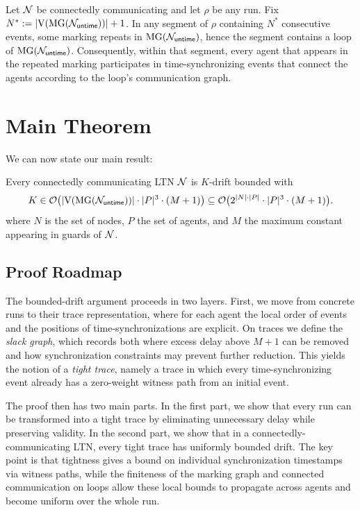 \begin{lemma}
\label{lem:segment-has-sync}
Let $\mathcal{N}$ be connectedly communicating and let $\rho$ be any run.
Fix $N^* := |\mathrm{V}(\operatorname{MG}(\mathcal{N}_{\mathsf{untime}}))|+1$.
In any segment of $\rho$ containing $N^*$ consecutive events, some marking repeats in $\operatorname{MG}(\mathcal{N}_{\mathsf{untime}})$, hence the segment contains a loop of $\operatorname{MG}(\mathcal{N}_{\mathsf{untime}})$.
Consequently, within that segment, every agent that appears in the repeated marking participates in time-synchronizing events that connect the agents according to the loop's communication graph.
\end{lemma}


\section{Main Theorem}

We can now state our main result:

\begin{theorem}
Every connectedly communicating LTN $\mathcal{N}$ is $K$-drift bounded with
\[
K \in \mathcal{O}\bigl(|\mathrm{V}(\operatorname{MG}(\mathcal{N}_{\mathsf{untime}}))|\cdot |P|^3 \cdot (M+1)\bigr)
\subseteq \mathcal{O}\bigl(2^{|N|\cdot|P|}\cdot |P|^3 \cdot (M+1)\bigr).
\]
   where $N$ is the set of nodes, $P$ the set of agents, and $M$ the maximum constant appearing in guards of $\mathcal{N}$. 
\end{theorem}

\subsection{Proof Roadmap}
The bounded-drift argument proceeds in two layers. First, we move from concrete
runs to their trace representation, where for each agent the local order of events
and the positions of time-synchronizations are explicit. On traces we define the
\emph{slack graph}, which records both where excess delay above $M+1$ can be
removed and how synchronization constraints may prevent further reduction.
This yields the notion of a \emph{tight trace}, namely a trace in which every
time-synchronizing event already has a zero-weight witness path from an initial
event.

The proof then has two main parts. In the first part, we show that every run can
be transformed into a tight trace by eliminating unnecessary delay while preserving
validity. In the second part, we show that in a connectedly-communicating LTN,
every tight trace has uniformly bounded drift. The key point is that tightness gives
a bound on individual synchronization timestamps via witness paths, while the
finiteness of the marking graph and connected communication on loops allow these
local bounds to propagate across agents and become uniform over the whole run.

